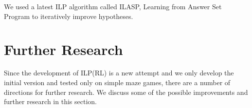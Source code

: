We used a latest ILP algorithm called ILASP, Learning from Answer Set Program to iteratively improve hypotheses.

\section{Further Research}
\label{sec:further_research}

Since the development of ILP(RL) is a new attempt and we only develop the initial version and tested only on simple maze games, 
there are a number of directions for further research. We discuss some of the possible improvements and further research in this section.

